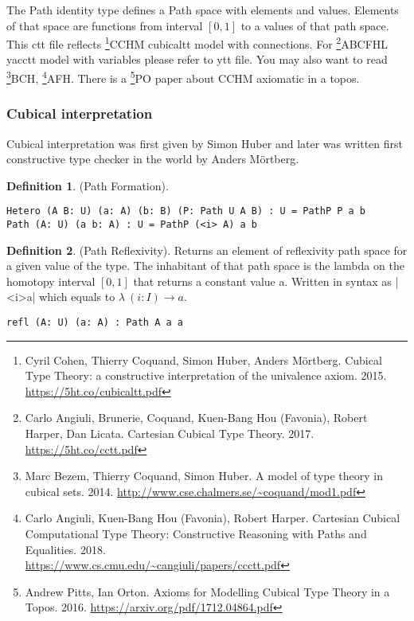 \documentclass[twoside]{article}
\theoremstyle{definition}
\newtheorem{definition}{Definition}
\begin{document}
The Path identity type defines a Path space with elements and values.
Elements of that space are functions from interval $[0,1]$ to a values of that path space.
This ctt file reflects \footnote{Cyril Cohen, Thierry Coquand, Simon Huber, Anders M{\"{o}}rtberg. Cubical Type Theory: a constructive interpretation of the univalence axiom. 2015. \url{https://5ht.co/cubicaltt.pdf}}{CCHM} cubicaltt model with connections.
For \footnote{Carlo Angiuli, Brunerie, Coquand, Kuen-Bang Hou (Favonia), Robert Harper, Dan Licata. Cartesian Cubical Type Theory. 2017. \url{https://5ht.co/cctt.pdf}}{ABCFHL} yacctt model with
variables please refer to ytt file. You may also want to
read \footnote{Marc Bezem, Thierry Coquand, Simon Huber. A model of type theory in cubical sets. 2014. \url{http://www.cse.chalmers.se/~coquand/mod1.pdf}}{BCH},
\footnote{Carlo Angiuli, Kuen-Bang Hou (Favonia), Robert Harper. Cartesian Cubical Computational Type Theory: Constructive Reasoning with Paths and Equalities. 2018. \\ \url{https://www.cs.cmu.edu/~cangiuli/papers/ccctt.pdf}}{AFH}.
There is a \footnote{Andrew Pitts, Ian Orton. Axioms for Modelling Cubical Type Theory in a Topos. 2016. \url{https://arxiv.org/pdf/1712.04864.pdf}}{PO} paper about CCHM axiomatic in a topos.

\subsubsection*{Cubical interpretation}

Cubical interpretation was first given by Simon Huber\cite{Huber16} and later was
written first constructive type checker in the world by Anders M{\"{o}}rtberg\cite{Mortberg17}.

\begin{definition} (Path Formation).
\begin{lstlisting}
Hetero (A B: U) (a: A) (b: B) (P: Path U A B) : U = PathP P a b
Path (A: U) (a b: A) : U = PathP (<i> A) a b
\end{lstlisting}
\end{definition}

\begin{definition} (Path Reflexivity).
Returns an element of reflexivity path space for a given value of the type.
The inhabitant of that path space is the lambda on the homotopy
interval $[0,1]$ that returns a constant value a. Written in
syntax as |<i>a| which equals to $\lambda\ (i: I) \rightarrow a$.
\begin{lstlisting}
refl (A: U) (a: A) : Path A a a
\end{lstlisting}
\end{definition}
\end{document}
